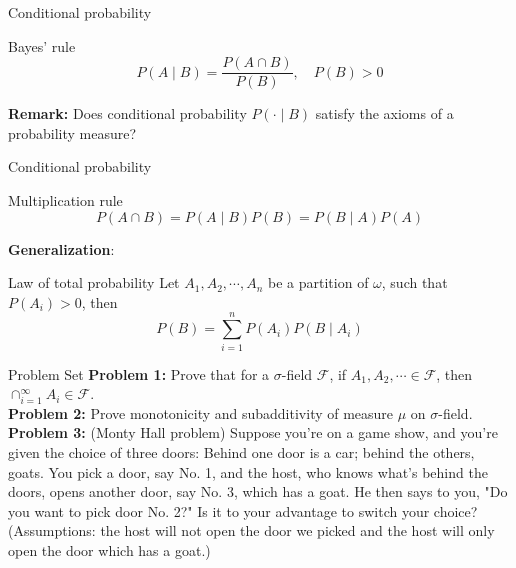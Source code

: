 \documentclass [aspectratio=169]{beamer}
\newcommand{\mc}{\mathcal}
\begin{document}
\begin{frame}{Conditional probability}
    \begin{block}{Bayes' rule}
    $$P(A \mid B) = \dfrac{P(A\cap B)}{P(B)}, \quad P(B) > 0$$
    \end{block}
    \vspace{0.1in}
    \textbf{Remark:} Does conditional probability $P(\cdot \mid B)$ satisfy the axioms of a probability measure?
    \vspace{1.5in}
\end{frame}

\begin{frame}{Conditional probability}
\begin{block}{Multiplication rule}
$${P(A\cap B)} = P(A \mid B) P(B) = P(B \mid A) P(A)$$
\end{block}
\vspace{0.1in}
\textbf{Generalization}:
    \begin{block}{Law of total probability}
    Let $A_1, A_2, \cdots, A_n$ be a partition of $\omega$, such that $P(A_i) > 0$, then
    $$P(B) = \sum_{i = 1}^n P(A_i)P(B \mid A_i)$$
    \end{block}
    \vspace{1in}
\end{frame}

\begin{frame}{Problem Set}
    \textbf{Problem 1:} Prove that for a $\sigma$-field $\mc{F}$, if $A_1, A_2, \cdots \in \mc{F}$, then $\cap_{i = 1}^\infty A_i \in \mc{F}$.\\
    \vspace{0.1in}
    \textbf{Problem 2:} Prove monotonicity and subadditivity of measure $\mu$ on $\sigma$-field. \\
    \vspace{0.1in}
    \textbf{Problem 3:} (Monty Hall problem) Suppose you're on a game show, and you're given the choice of three doors: Behind one door is a car; behind the others, goats. You pick a door, say No. 1, and the host, who knows what's behind the doors, opens another door, say No. 3, which has a goat. He then says to you, "Do you want to pick door No. 2?" Is it to your advantage to switch your choice?\\
    (Assumptions: the host will not open the door we picked and the host will only open the door which has a goat.)

\end{frame}
\end{document}
